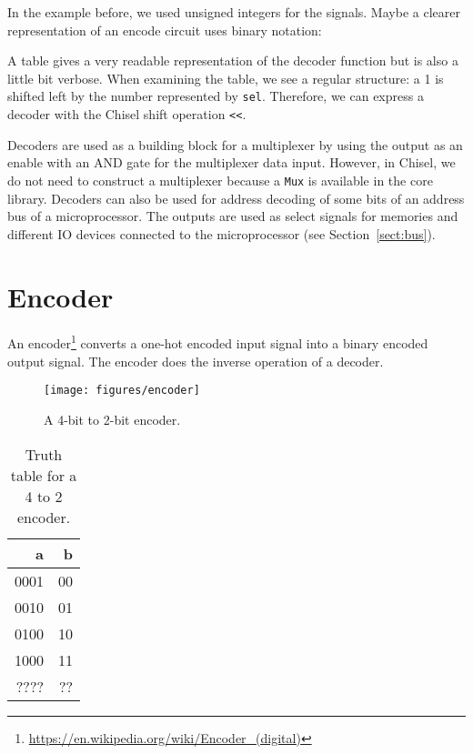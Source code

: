 \documentclass[%
    10pt,
    headinclude, footexclude,
    openright, %
    notitlepage,
    cleardoubleempty,
    headsepline,
    pointlessnumbers,
    bibtotoc, idxtotoc,
    ]{scrbook}
\newcommand{\scale}{0.7}
\newcommand{\code}[1]{{\lstinline[basicstyle=\small\ttfamily]{#1}}}
\newcommand{\myref}[2]{\href{#1}{#2}}
\renewcommand{\myref}[2]{{#2}{\footnote{\url{#1}}}}
\begin{document}
In the example before, we used unsigned integers for the signals. Maybe a clearer representation
of an encode circuit uses binary notation:



A table gives a very readable representation of the decoder function but is also
a little bit verbose.
When examining the table, we see a regular structure: a 1 is shifted left by the number
represented by \code{sel}. Therefore, we can express a decoder with the Chisel shift
operation \code{<<}.


Decoders are used as a building block for a multiplexer by using the output as an enable
with an AND gate for the multiplexer data input. However, in Chisel, we do not need to construct
a multiplexer because a \code{Mux} is available in the core library.
Decoders can also be used for address decoding of some bits of an address bus of
a microprocessor. The outputs are used as
select signals for memories and different IO devices connected to the microprocessor
(see Section~\ref{sect:bus}).


\section{Encoder}

An \myref{https://en.wikipedia.org/wiki/Encoder_(digital)}{encoder}
converts a one-hot encoded input signal into a binary encoded output signal.
The encoder does the inverse operation of a decoder.

\begin{figure}
  \centering
  \texttt{[image: figures/encoder]}
  \caption{A 4-bit to 2-bit encoder.}
  \label{fig:encoder}
\end{figure}


\begin{table}
 \centering
  \begin{tabular}{rr}
    \toprule
    a & b \\
    \midrule
    0001 & 00 \\
    0010 & 01 \\
    0100 & 10 \\
    1000 & 11 \\
    ???? & ?? \\
    \bottomrule
  \end{tabular}
  \caption{Truth table for a 4 to 2 encoder.}
 \label{tab:encoder}
\end{table}
\end{document}
